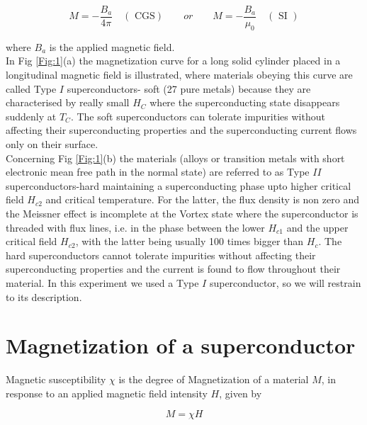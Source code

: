 \documentclass[openany,11pt,a4paper]{report}
\begin{document}
\begin{equation}
M = - \dfrac{B_{a}}{4\pi}  \quad (\text{ CGS}) \quad \quad or \quad \quad 
M = - \dfrac{B_{a}}{\mu_{0}}  \quad (\text { SI })
\label{magnetization}
\end{equation}

where $B_{a}$ is the applied magnetic field.\\
 
In Fig \ref{Fig:1}(a) the magnetization curve for a long solid cylinder placed in a longitudinal magnetic field is illustrated, where materials obeying this curve are called Type $I$ superconductors- soft (27 pure metals) because they are characterised by really small $H_{C}$ where the superconducting state disappears suddenly at $T_{C}$. The soft superconductors can tolerate impurities without affecting their superconducting properties and the superconducting current flows only on their surface. \\ Concerning Fig \ref{Fig:1}(b) the materials (alloys or transition metals with short electronic mean free path in the normal state) are referred to as Type $II$ superconductors-hard maintaining a superconducting phase upto higher critical field $H_{c2}$ and critical temperature. For the latter, the flux density is non zero and the Meissner effect is incomplete at the Vortex state where the superconductor is threaded with flux lines, i.e. in the phase between the lower $H_{c1}$ and the upper critical field $H_{c2}$, with the latter being usually 100 times bigger than $H_{c}$. The hard superconductors cannot tolerate impurities without affecting their superconducting properties and the current is found to flow throughout their material. In this experiment we used a Type $I$ superconductor, so we will restrain to its description.\\


 






\section{Magnetization of a superconductor}

Magnetic susceptibility $\chi$ is the degree of Magnetization of a material $M$, in response to an applied magnetic field intensity $H$, given by

\begin{equation}
M = \chi H
\end{equation}
\end{document}
